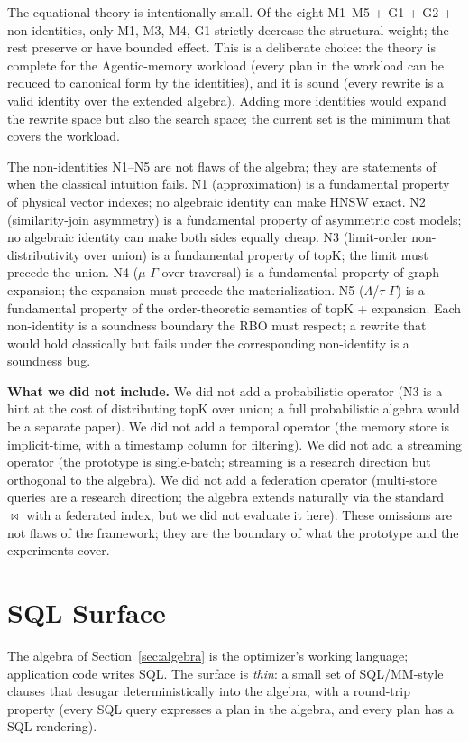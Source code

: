 \documentclass[sigconf]{acmart}
\theoremstyle{plain}
\theoremstyle{definition}
\theoremstyle{remark}
\begin{document}
The equational theory is intentionally small. Of the eight
M1--M5 + G1 + G2 + non-identities, only M1, M3, M4, G1 strictly
decrease the structural weight; the rest preserve or have
bounded effect. This is a deliberate choice: the theory is
complete for the Agentic-memory workload (every plan in the
workload can be reduced to canonical form by the identities),
and it is sound (every rewrite is a valid identity over the
extended algebra). Adding more identities would expand the
rewrite space but also the search space; the current set is the
minimum that covers the workload.

The non-identities N1--N5 are not flaws of the algebra; they
are statements of when the classical intuition fails. N1
(approximation) is a fundamental property of physical vector
indexes; no algebraic identity can make HNSW exact. N2
(similarity-join asymmetry) is a fundamental property of
asymmetric cost models; no algebraic identity can make both
sides equally cheap. N3 (limit-order non-distributivity over
union) is a fundamental property of topK; the limit must
precede the union. N4 ($\mu$-$\Gamma$ over traversal) is a
fundamental property of graph expansion; the expansion must
precede the materialization. N5 ($\Lambda$/$\tau$-$\Gamma$) is
a fundamental property of the order-theoretic semantics of
topK + expansion. Each non-identity is a soundness boundary the
RBO must respect; a rewrite that would hold classically but
fails under the corresponding non-identity is a soundness bug.

\noindent\textbf{What we did not include.} We did not add a
probabilistic operator (N3 is a hint at the cost of distributing
topK over union; a full probabilistic algebra would be a
separate paper). We did not add a temporal operator (the
memory store is implicit-time, with a timestamp column for
filtering). We did not add a streaming operator (the prototype
is single-batch; streaming is a research direction but
orthogonal to the algebra). We did not add a federation
operator (multi-store queries are a research direction; the
algebra extends naturally via the standard $\bowtie$ with a
federated index, but we did not evaluate it here). These
omissions are not flaws of the framework; they are the
boundary of what the prototype and the experiments cover.

\section{SQL Surface}\label{sec:sql}

The algebra of Section~\ref{sec:algebra} is the optimizer's
working language; application code writes SQL. The surface is
\emph{thin}: a small set of SQL/MM-style clauses that desugar
deterministically into the algebra, with a round-trip property
(every SQL query expresses a plan in the algebra, and every plan
has a SQL rendering).
\end{document}
